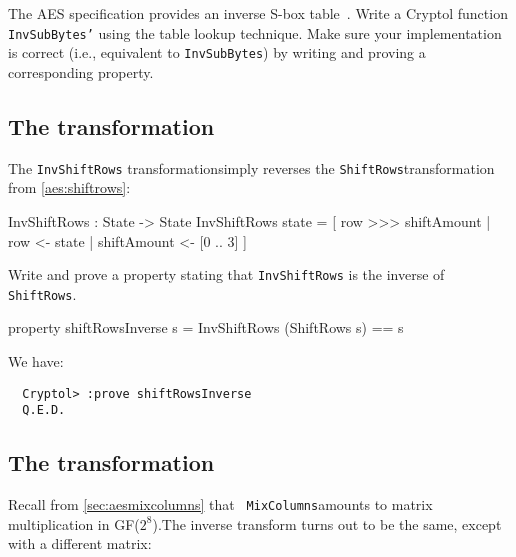 \begin{Exercise}\label{ex:invsb:3}
  The AES specification provides an inverse S-box table~\cite[figure
  14, section 5.3.2]{aes}. Write a Cryptol function {\tt InvSubBytes'}
  using the table lookup technique. Make sure your implementation is
  correct (i.e., equivalent to {\tt InvSubBytes}) by writing and
  proving a corresponding property.
\end{Exercise}

\subsection{The {} transformation}
\label{sec:ttfam-invsh-transf}

The {\tt InvShiftRows} transformation\indAESInvShiftRows simply
reverses the {\tt ShiftRows}\indAESShiftRows transformation from
\autoref{aes:shiftrows}:

\begin{code}
  InvShiftRows : State -> State
  InvShiftRows state = [ row >>> shiftAmount 
                       | row <- state
                       | shiftAmount <- [0 .. 3]
                       ]
\end{code}

\begin{Exercise}\label{ex:aesisr:0}
  Write and prove a property stating that {\tt InvShiftRows} is the
  inverse of {\tt ShiftRows}.
\end{Exercise}
\begin{Answer}
\begin{code}
  property shiftRowsInverse s = InvShiftRows (ShiftRows s) == s
\end{code}
We have:
\begin{Verbatim}
  Cryptol> :prove shiftRowsInverse
  Q.E.D.
\end{Verbatim}
\end{Answer}

\subsection{The {} transformation}
\label{sec:ttfam-invm-transf}

Recall from \autoref{sec:aesmixcolumns} that {\tt
  MixColumns}\indAESMixColumns amounts to matrix multiplication in
GF($2^8$).\indGF The inverse transform turns out to be the same,
except with a different matrix:\indAESInvMixColumns

